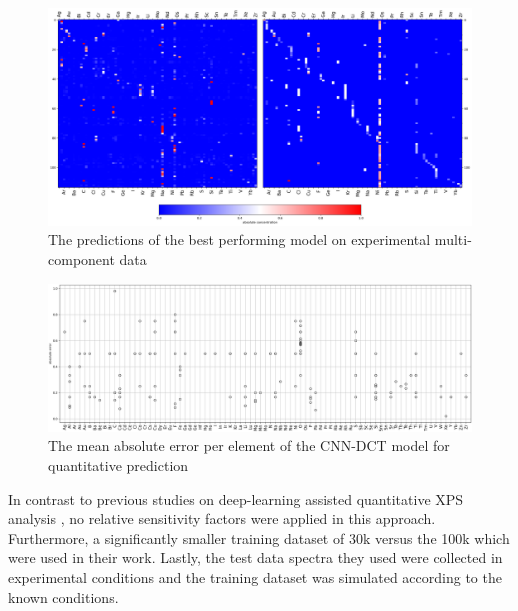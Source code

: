 \begin{figure}
    \centerline{
    \centering
    \includegraphics[width=1.2\textwidth]{Figures/cnn_dct_mae_32F_multi_best_model_pred.png}}
    \caption{The predictions of the best performing model on experimental multi-component data}
    \label{fig:multi_best_model}
\end{figure}

\begin{figure}
    \centerline{
    \centering
    \includegraphics[width=\textwidth]{Figures/mae_per_element_best_perf_multi.png}}
    \caption{The mean absolute error per element of the CNN-DCT model for quantitative prediction}
    \label{fig:boxplot}
\end{figure}

In contrast to previous studies on deep-learning assisted quantitative XPS analysis \cite{drera_deep_2019}, no relative sensitivity factors were applied in this approach. Furthermore, a significantly smaller training dataset of 30k versus the 100k which were used in their work. Lastly, the test data spectra they used were collected in experimental conditions and the training dataset was simulated according to the known conditions.

